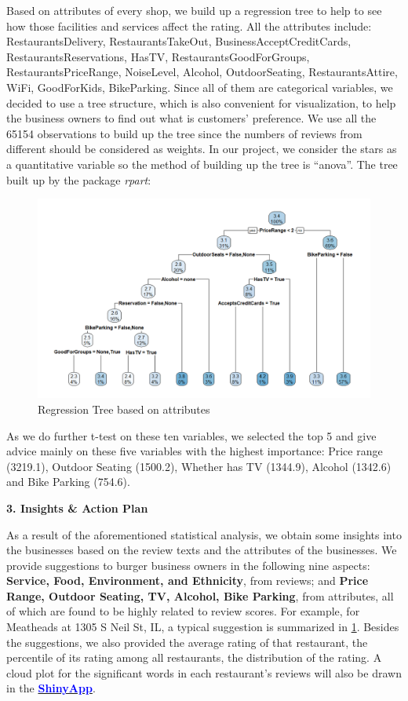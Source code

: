 \documentclass[12pt]{article}
\begin{document}
	Based on attributes of every shop, we build up a regression tree to help to see how those facilities and services affect the rating. All the attributes include: RestaurantsDelivery, RestaurantsTakeOut, BusinessAcceptCreditCards, RestaurantsReservations, HasTV, RestaurantsGoodForGroups, RestaurantsPriceRange, NoiseLevel, Alcohol, OutdoorSeating, RestaurantsAttire, WiFi, GoodForKids, BikeParking. Since all of them are categorical variables, we decided to use a tree structure, which is also convenient for visualization, to help the business owners to find out what is customers’ preference. We use all the 65154 observations to build up the tree since the numbers of reviews from different should be considered as weights. In our project, we consider the stars as a quantitative variable so the method of building up the tree is “anova”. The tree built up by the package \textit{rpart}:\\
	\begin{figure}[h!]
		\centering
		\includegraphics[width=15cm]{RegTree.png}
		\caption{Regression Tree based on attributes}
		\label{fig:ins}
	\end{figure}
	
	As we do further t-test on these ten variables, we selected the top 5 and give advice mainly on these five variables with the highest importance: Price range (3219.1), Outdoor Seating (1500.2), Whether has TV (1344.9), Alcohol (1342.6) and Bike Parking (754.6).
	
	\noindent\textbf{3. Insights \& Action Plan}
	
	As a result of the aforementioned statistical analysis, we obtain some insights into the businesses based on the review texts and the attributes of the businesses. We provide suggestions to burger business owners in the following nine aspects: \textbf{Service, Food, Environment, and Ethnicity}, from reviews; and \textbf{Price Range, Outdoor Seating, TV, Alcohol, Bike Parking}, from attributes, all of which are found to be highly related to review scores. For example, for Meatheads at 1305 S Neil St, IL, a typical suggestion is summarized in \cref{fig:ins}. Besides the suggestions, we also provided the average rating of that restaurant, the percentile of its rating among all restaurants, the distribution of the rating. A cloud plot for the significant words in each restaurant's reviews will also be drawn in the \href{https://jiawei98.shinyapps.io/UI_module3/}{\textbf{\textcolor{blue}{ShinyApp}}}.
	
\end{document}

